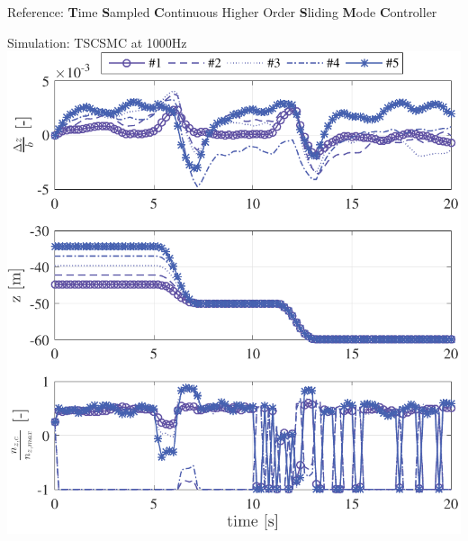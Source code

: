 \documentclass[12pt,svgnames,table,draft=false]{beamer}
\begin{document}
\begin{frame}{}
\centering
\Large
\vspace{3em}
Reference: \textbf{T}ime \textbf{S}ampled \textbf{C}ontinuous Higher Order \textbf{S}liding \textbf{M}ode \textbf{C}ontroller \cite{galzi2006uav} \\
\end{frame}

\begin{frame}{Simulation: TSCSMC \cite{galzi2006uav} at 1000Hz}
\centering
\includegraphics[height=.6\paperwidth]{TSCSMC-1000Hz-TIMESCALESEPARATION-turbulence=1}    %
\end{frame}
\end{document}
